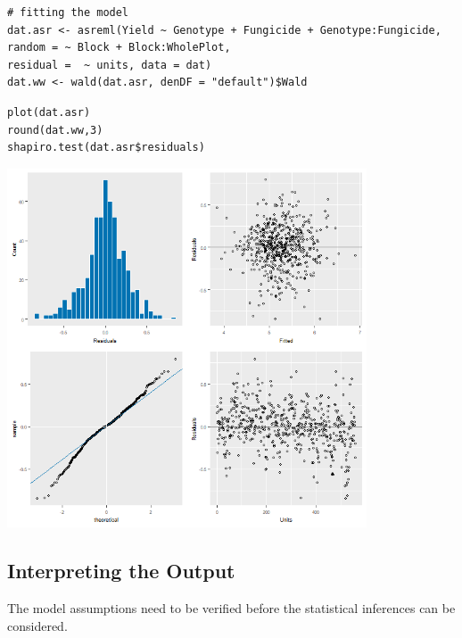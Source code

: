 \documentclass[a4paper, 10pt, fleqn, twosided]{memoir}
\begin{document}
\begin{tcolorbox}[title = Fitting the linear model for a Split-plot Design]
\begin{verbatim}
# fitting the model
dat.asr <- asreml(Yield ~ Genotype + Fungicide + Genotype:Fungicide,
random = ~ Block + Block:WholePlot,
residual =  ~ units, data = dat)
dat.ww <- wald(dat.asr, denDF = "default")$Wald
\end{verbatim}

\tcblower
\begin{verbatim}
plot(dat.asr)
round(dat.ww,3)
shapiro.test(dat.asr$residuals)
\end{verbatim}
\end{tcolorbox}

\begin{tcolorbox}[title = Example 5 Output]
\includegraphics[width=0.8\textwidth, frame]{Example5Resplot.png}
\end{tcolorbox}


\subsection{Interpreting the Output}

The model assumptions need to be verified before the statistical inferences can be considered.
\end{document}
